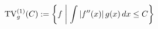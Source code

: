 \documentclass[preview]{standalone}
\begin{document}
\begin{align*}
\special{dvisvgm:raw <g id='unique000'>}\mathrm{TV}_g^{(1)}(C):=\left\{f\;\middle|\;\int|f''(x)|\,g(x)\,dx\le C\right\}\special{dvisvgm:raw </g>}
\end{align*}
\end{document}
